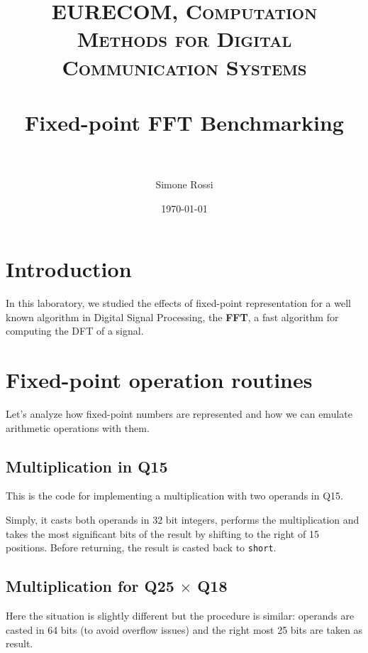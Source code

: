 \documentclass[paper=a4, fontsize=12pt]{scrartcl} %
\title{
\normalfont \normalsize
\textsc{EURECOM, Computation Methods for Digital Communication Systems} \\ [25pt] %
\horrule{0.5pt} \\[0.4cm] %
\huge Fixed-point FFT Benchmarking \\ %
\horrule{2pt} \\[0.5cm] %
}
\author{Simone Rossi} %
\date{\normalsize\today} %
\numberwithin{equation}{section} %
\numberwithin{figure}{section} %
\numberwithin{table}{section} %
\begin{document}
\maketitle %


\section{Introduction}

In this laboratory, we studied the effects of fixed-point representation for a
well known algorithm in Digital Signal Processing, the \textbf{FFT}, a fast algorithm
for computing the DFT of a signal.

\section{Fixed-point operation routines}

Let's analyze how fixed-point numbers are represented and how we can emulate
arithmetic operations with them.

\subsection{Multiplication in Q15}

This is the code for implementing a multiplication with two operands in Q15.



Simply, it casts both operands in 32 bit integers, performs the multiplication and
takes the most significant bits of the result by shifting to the right of
15 positions. Before returning, the result is casted back to \texttt{short}.

\subsection{Multiplication for Q25 $\times$ Q18}

Here the situation is slightly different but the procedure is similar: operands
are casted in 64 bits (to avoid overflow issues) and the right most 25 bits are
taken as result.


\end{document}

